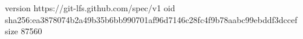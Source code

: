 version https://git-lfs.github.com/spec/v1
oid sha256:ea3878074b2a49b35b6bb990701af96d7146c28fc4f9b78aabc99ebddf3dccef
size 87560
